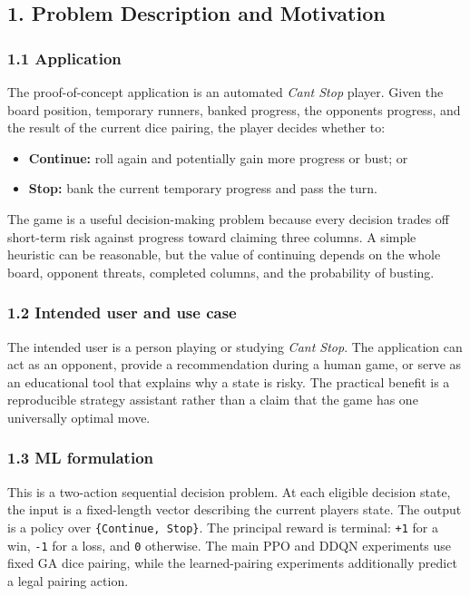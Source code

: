 \documentclass[
  11pt,
]{article}
\providecommand{\tightlist}{%
  \setlength{\itemsep}{0pt}\setlength{\parskip}{0pt}}
\begin{document}
\subsection{1. Problem Description and
Motivation}\label{1-problem-description-and-motivation}

\subsubsection{1.1 Application}\label{11-application}

The proof-of-concept application is an automated
\emph{Can\textquotesingle t Stop} player. Given the board position,
temporary runners, banked progress, the opponent\textquotesingle s
progress, and the result of the current dice pairing, the player decides
whether to:

\begin{itemize}
\tightlist
\item
  \textbf{Continue:} roll again and potentially gain more progress or
  bust; or
\item
  \textbf{Stop:} bank the current temporary progress and pass the turn.
\end{itemize}

The game is a useful decision-making problem because every decision
trades off short-term risk against progress toward claiming three
columns. A simple heuristic can be reasonable, but the value of
continuing depends on the whole board, opponent threats, completed
columns, and the probability of busting.

\subsubsection{1.2 Intended user and use
case}\label{12-intended-user-and-use-case}

The intended user is a person playing or studying
\emph{Can\textquotesingle t Stop}. The application can act as an
opponent, provide a recommendation during a human game, or serve as an
educational tool that explains why a state is risky. The practical
benefit is a reproducible strategy assistant rather than a claim that
the game has one universally optimal move.

\subsubsection{1.3 ML formulation}\label{13-ml-formulation}

This is a two-action sequential decision problem. At each eligible
decision state, the input is a fixed-length vector describing the
current player\textquotesingle s state. The output is a policy over
\texttt{\{Continue,\ Stop\}}. The principal reward is terminal:
\texttt{+1} for a win, \texttt{-1} for a loss, and \texttt{0} otherwise.
The main PPO and DDQN experiments use fixed GA dice pairing, while the
learned-pairing experiments additionally predict a legal pairing action.
\end{document}
